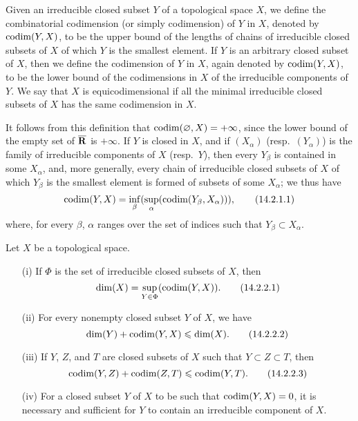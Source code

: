 \begin{definition}[14.2.1]
\label{0.14.2.1}
Given an irreducible closed subset $Y$ of a topological space $X$, we define the combinatorial codimension (or simply codimension) of $Y$ in $X$, denoted by $\operatorname{codim}(Y,X)$, to be the upper bound of the lengths of chains of irreducible closed subsets of $X$ of which $Y$ is the smallest element.
If $Y$ is an arbitrary closed subset of $X$, then we define the codimension of $Y$ in $X$, again denoted by $\operatorname{codim}(Y,X)$, to be the lower bound of the codimensions in $X$ of the irreducible components of $Y$.
We say that $X$ is equicodimensional if all the minimal irreducible closed subsets of $X$ has the same codimension in $X$.
\end{definition}

It follows from this definition that $\operatorname{codim}(\varnothing,X)=+\infty$, since the lower bound of the empty set of $\overline{\mathbf{R}}$ is $+\infty$.
If $Y$ is closed in $X$, and if $(X_\alpha)$ (resp.~$(Y_\alpha)$) is the family of irreducible components of $X$ (resp.~$Y$), then every $Y_\beta$ is contained in some $X_\alpha$, and, more generally, every chain of irreducible closed subsets of $X$ of which $Y_\beta$ is the smallest element is formed of subsets of some $X_\alpha$; we thus have
\[
\label{eq:0.14.2.1.1}
  \operatorname{codim}(Y,X)=\inf_\beta(\sup_\alpha(\operatorname{codim}(Y_\beta,X_\alpha))),
  \tag{14.2.1.1}
\]
where, for every $\beta$, $\alpha$ ranges over the set of indices such that $Y_\beta\subset X_\alpha$.

\begin{proposition}[14.2.2]
\label{0.14.2.2}
Let $X$ be a topological space.
\begin{enumerate}
  \item[{\rm(i)}] If $\Phi$ is the set of irreducible closed subsets of $X$, then
    \[
    \label{eq:0.14.2.2.1}
      \dim(X)=\sup_{Y\in\Phi}(\operatorname{codim}(Y,X)).
      \tag{14.2.2.1}
    \]
  \item[{\rm(ii)}] For every nonempty closed subset $Y$ of $X$, we have
    \[
    \label{eq:0.14.2.2.2}
      \dim(Y)+\operatorname{codim}(Y,X)\leqslant\dim(X).
      \tag{14.2.2.2}
    \]
  \item[{\rm(iii)}] If $Y$, $Z$, and $T$ are closed subsets of $X$ such that $Y\subset Z\subset T$, then
    \[
    \label{eq:0.14.2.2.3}
      \operatorname{codim}(Y,Z)+\operatorname{codim}(Z,T)\leqslant\operatorname{codim}(Y,T).
       \tag{14.2.2.3}
    \]
  \item[{\rm(iv)}] For a closed subset $Y$ of $X$ to be such that $\operatorname{codim}(Y,X)=0$, it is necessary and sufficient for $Y$ to contain an irreducible component of $X$.
\end{enumerate}
\end{proposition}

